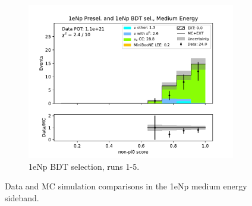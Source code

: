 \begin{figure}[H]
\begin{subfigure}{0.33\linewidth}
        \includegraphics[width=\linewidth]{technote/Sidebands/Figures/NearSideband/near_sideband_nonpi0_score_run1234b4c4d5_NP_NPBDT_MEDIUM_ENERGY.pdf}
        \caption{1eNp BDT selection, runs 1-5.}
    \end{subfigure}
    \caption{Data and MC simulation comparisons in the 1eNp medium energy sideband.}
\end{figure}

